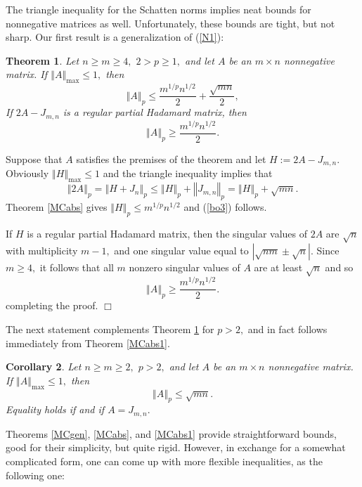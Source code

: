 \documentclass[12pt]{article}%
\newtheorem{theorem}{Theorem}[section]
\newtheorem{corollary}[theorem]{Corollary}
\newenvironment{proof}[1][Proof]{\noindent{\textbf {#1}  }}  {\hfill$\Box$\bigskip}
\begin{document}
The triangle inequality for the Schatten norms implies neat bounds for
nonnegative matrices as well. Unfortunately, these bounds are tight, but not
sharp. Our first result is a generalization of (\ref{N1}):

\begin{theorem}
\label{KMSmn}Let $n\geq m\geq4,$ $2>p\geq1,$ and let $A$ be an $m\times n$
nonnegative matrix. If $\left\Vert A\right\Vert _{\max}\leq1,$ then
\begin{equation}
\left\Vert A\right\Vert _{p}\leq\frac{m^{1/p}n^{1/2}}{2}+\frac{\sqrt{mn}}{2},
\label{bo3}%
\end{equation}
If $2A-J_{m,n}$ is a regular partial Hadamard matrix, then
\[
\left\Vert A\right\Vert _{p}\geq\frac{m^{1/p}n^{1/2}}{2}.
\]

\end{theorem}

\begin{proof}
Suppose that $A$ satisfies the premises of the theorem and let $H:=2A-J_{m,n}%
$. Obviously $\left\Vert H\right\Vert _{\max}\leq1$ and the triangle
inequality implies that
\[
\left\Vert 2A\right\Vert _{p}=\left\Vert H+J_{n}\right\Vert _{p}\leq\left\Vert
H\right\Vert _{p}+\left\Vert J_{m,n}\right\Vert _{p}=\left\Vert H\right\Vert
_{p}+\sqrt{mn}.
\]
Theorem \ref{MCabs} gives $\left\Vert H\right\Vert _{p}\leq m^{1/p}n^{1/2}$
and (\ref{bo3}) follows.

If $H$ is a regular partial Hadamard matrix, then the singular values of $2A$
are $\sqrt{n}$ with multiplicity $m-1,$ and one singular value equal to
$\left\vert \sqrt{nm}\pm\sqrt{n}\right\vert .$ Since $m\geq4,$ it follows that
all $m$ nonzero singular values of $A$ are at least $\sqrt{n}$ and so%
\[
\left\Vert A\right\Vert _{p}\geq\frac{m^{1/p}n^{1/2}}{2}.
\]
completing the proof.
\end{proof}

The next statement complements Theorem \ref{KMSmn} for $p>2,$ and in fact
follows immediately from Theorem \ref{MCabs1}.

\begin{corollary}
Let $n\geq m\geq2,$ $p>2,$ and let $A$ be an $m\times n$ nonnegative matrix.
If $\left\Vert A\right\Vert _{\max}\leq1,$ then
\[
\left\Vert A\right\Vert _{p}\leq\sqrt{mn}.
\]
Equality holds if and if $A=J_{m,n}.$
\end{corollary}

Theorems \ref{MCgen}, \ref{MCabs}, and \ref{MCabs1} provide straightforward
bounds, good for their simplicity, but quite rigid. However, in exchange for a
somewhat complicated form, one can come up with more flexible inequalities, as
the following one:
\end{document}
